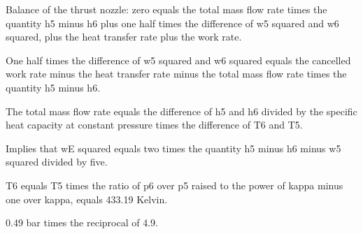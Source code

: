 Balance of the thrust nozzle: zero equals the total mass flow rate times the quantity h5 minus h6 plus one half times the difference of w5 squared and w6 squared, plus the heat transfer rate plus the work rate.

One half times the difference of w5 squared and w6 squared equals the cancelled work rate minus the heat transfer rate minus the total mass flow rate times the quantity h5 minus h6.

The total mass flow rate equals the difference of h5 and h6 divided by the specific heat capacity at constant pressure times the difference of T6 and T5.

Implies that wE squared equals two times the quantity h5 minus h6 minus w5 squared divided by five.

T6 equals T5 times the ratio of p6 over p5 raised to the power of kappa minus one over kappa, equals 433.19 Kelvin.

0.49 bar times the reciprocal of 4.9.